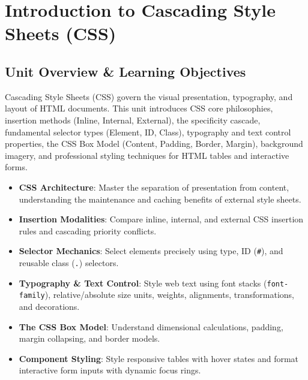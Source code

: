 \chapter{Introduction to Cascading Style Sheets (CSS)}
\label{chap:cascading-style-sheets}

\section{Unit Overview \& Learning Objectives}

\begin{conceptbox}
Cascading Style Sheets (CSS) govern the visual presentation, typography, and layout of HTML documents. This unit introduces CSS core philosophies, insertion methods (Inline, Internal, External), the specificity cascade, fundamental selector types (Element, ID, Class), typography and text control properties, the CSS Box Model (Content, Padding, Border, Margin), background imagery, and professional styling techniques for HTML tables and interactive forms.
\end{conceptbox}

\begin{itemize}[leftmargin=1.5em]
    \item \textbf{CSS Architecture}: Master the separation of presentation from content, understanding the maintenance and caching benefits of external style sheets.
    \item \textbf{Insertion Modalities}: Compare inline, internal, and external CSS insertion rules and cascading priority conflicts.
    \item \textbf{Selector Mechanics}: Select elements precisely using type, ID (\texttt{\#}), and reusable class (\texttt{.}) selectors.
    \item \textbf{Typography \& Text Control}: Style web text using font stacks (\texttt{font-family}), relative/absolute size units, weights, alignments, transformations, and decorations.
    \item \textbf{The CSS Box Model}: Understand dimensional calculations, padding, margin collapsing, and border models.
    \item \textbf{Component Styling}: Style responsive tables with hover states and format interactive form inputs with dynamic focus rings.
\end{itemize}

